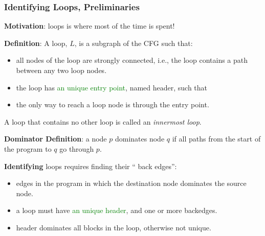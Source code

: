 \documentclass{beamer}
\newcommand{\green}[1]{\textcolor{Green}{{#1}}}
\renewcommand{\emph}[1]{\textcolor{structure}{#1}}
\newcommand{\emp}[1]{\textcolor{DikuRed}{ #1}}
\begin{document}
\begin{frame}[fragile,t]
    \frametitle{Identifying Loops, Preliminaries}

{\bf Motivation}: loops is where most of the time is spent!

\pause
\bigskip

{\bf Definition}: A loop, $L$, is a subgraph of the \textsc{CFG} such that:

\begin{itemize}

\item all nodes of the loop are \emp{strongly connected}, i.e., the loop
        contains a path between any two loop nodes.

\item the loop has \green{an unique entry point}, named \emph{header}, such that

\item the only way to reach a loop node is through the entry point.

\end{itemize}

A loop that contains no other loop is called an {\em innermost loop}.

\pause
\bigskip

{\bf Dominator Definition}: a node $p$ \emp{dominates} node $q$ if all paths from
the start of the program to $q$ go through $p$.

\bigskip

{\bf Identifying} loops requires finding their ``\emp{back edges}'':

\begin{itemize}

\item edges in the program in which the destination node dominates
        the source node.

\item a loop must have \green{an unique header}, and \emp{one or more backedges}.

\item header dominates all blocks in the loop, otherwise not unique.

\end{itemize}

\end{frame}
\end{document}
